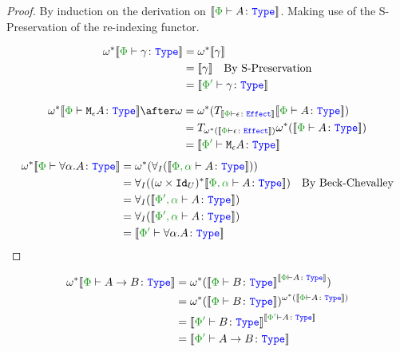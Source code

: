\documentclass{report}
\begin{document}
\begin{framed}
    \begin{proof}
            By induction on the derivation on $\deno{\typerelation{\P}{A}{\type}}$. Making use of the S-Preservation of the re-indexing functor.
            
            \case{\tground}
            \begin{align*}
                \w\star\deno{\typerelation{\P}{\g}{\type}} &= \w\star\deno{\g}\\
                & =  \deno{\g}\qt{By S-Preservation}\\
                & = \deno{\typerelation{\P'}{\g}{\type}}
            \end{align*}
            
            \case{\teffect}
            \begin{align*}
                \w\star\deno{\typerelation{\P}{\mea}{\type}}\after\w & =  \w\star(\T{\deno{\typerelation{\P}{\e}{\effect}}}{\deno{\typerelation{\P}{A}{\type}}})\\
                &= \T{\w\star(\deno{\typerelation{\P}{\e}{\effect}})}{\w\star(\deno{\typerelation{\P}{A}{\type}})}\\
                & = \deno{\typerelation{\P'}{\mea}{\type}}
            \end{align*}
            \case{\tquant}
                \begin{align*}
                    \w\star\deno{\typerelation{\P}{\all{\a}A}{\type}} & = \w\star(\allI(\deno{\typerelation{\P,\a}{A}{\type}}))\\
                    & = \allI((\w\times\Id{U})\star\deno{\typerelation{\P,\a}{A}{\type}})\qt{By Beck-Chevalley}\\
                    & = \allI(\deno{\typerelation{\P',\a}{A}{\type}})\\
                    & = \allI(\deno{\typerelation{\P',\a}{A}{\type}})\\
                    & = \deno{\typerelation{\P'}{\all{\a}{A}}{\type}}\\
                \end{align*}
    \end{proof}
        
\end{framed}
    \case{\tfun}
    \begin{align*}
        \w\star\deno{\typerelation{\P}{\ab}{\type}} &= \w\star(\deno{\typerelation{\P}{B}{\type}}^{\deno{\typerelation{\P}{A}{\type}}})\\
        &=\w\star(\deno{\typerelation{\P}{B}{\type}})^{\w\star(\deno{\typerelation{\P}{A}{\type}})}\\
        & = \deno{\typerelation{\P'}{B}{\type}}^{\deno{\typerelation{\P'}{A}{\type}}}\\
        & = \deno{\typerelation{\P'}{\ab}{\type}}\\
    \end{align*}
\end{document}
